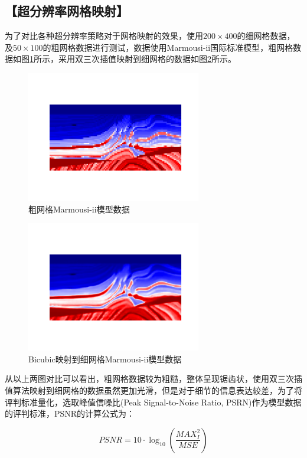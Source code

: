 \documentclass[11pt]{article}
\newcommand{\kai}{\CJKfamily{kai}}
\begin{document}
\subsection*{\kai\fontsize{11pt}{10pt} \selectfont【超分辨率网格映射】}
为了对比各种超分辨率策略对于网格映射的效果，使用$200 \times 400$的细网格数据，及$50 \times 100$的粗网格数据进行测试，数据使用Marmousi-ii国际标准模型，粗网格数据如图\ref{Fig_LR_Marmousi}所示，采用双三次插值映射到细网格的数据如图\ref{Fig_BC_Marmousi}所示。
\begin{figure}[htbp]
\centering
\includegraphics[width=3in]{./FigureFolder/Foundation/SuperResolution/SRCNN/LR_Marmousi.pdf}
\caption{粗网格Marmousi-ii模型数据}
\label{Fig_LR_Marmousi}
\end{figure}
\par
\begin{figure}[htbp]
\centering
\includegraphics[width=3in]{./FigureFolder/Foundation/SuperResolution/SRCNN/BC_Marmousi.pdf}
\caption{Bicubic映射到细网格Marmousi-ii模型数据}
\label{Fig_BC_Marmousi}
\end{figure}
\par
从以上两图对比可以看出，粗网格数据较为粗糙，整体呈现锯齿状，使用双三次插值算法映射到细网格的数据虽然更加光滑，但是对于细节的信息表达较差，为了将评判标准量化，选取峰值信噪比(Peak Signal-to-Noise Ratio, PSRN)作为模型数据的评判标准，PSNR的计算公式为：
\par
\begin{equation}\label{PSNR}
PSNR=10 \cdot \log_{10} (\frac{MAX_I^2}{MSE})
\end{equation}
\end{document}
